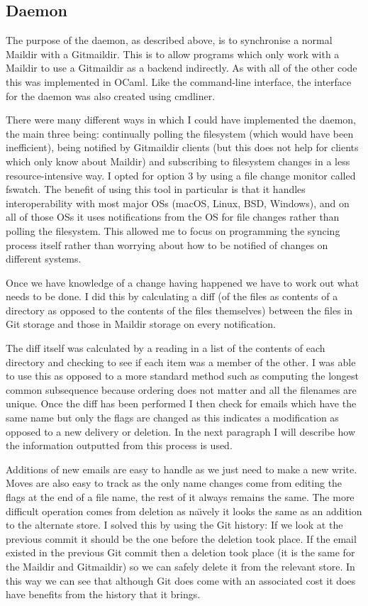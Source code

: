 \subsection{Daemon}

The purpose of the daemon, as described above, is to synchronise a normal Maildir with a Gitmaildir. This is to allow programs which only work with a Maildir to use a Gitmaildir as a backend indirectly. As with all of the other code this was implemented in OCaml. Like the command-line interface, the interface for the daemon was also created using cmdliner.

There were many different ways in which I could have implemented the daemon, the main three being: continually polling the filesystem (which would have been inefficient), being notified by Gitmaildir clients (but this does not help for clients which only know about Maildir) and subscribing to filesystem changes in a less resource-intensive way. I opted for option 3 by using a file change monitor called fswatch\cite{code_fswatch}. The benefit of using this tool in particular is that it handles interoperability with most major OSs (macOS, Linux, BSD, Windows), and on all of those OSs it uses notifications from the OS for file changes rather than polling the filesystem. This allowed me to focus on programming the syncing process itself rather than worrying about how to be notified of changes on different systems.

Once we have knowledge of a change having happened we have to work out what needs to be done. I did this by calculating a diff (of the files as contents of a directory as opposed to the contents of the files themselves) between the files in Git storage and those in Maildir storage on every notification.

The diff itself was calculated by a reading in a list of the contents of each directory and checking to see if each item was a member of the other. I was able to use this as opposed to a more standard method such as computing the longest common subsequence because ordering does not matter and all the filenames are unique. Once the diff has been performed I then check for emails which have the same name but only the flags are changed as this indicates a modification as opposed to a new delivery or deletion. In the next paragraph I will describe how the information outputted from this process is used.

Additions of new emails are easy to handle as we just need to make a new write. Moves are also easy to track as the only name changes come from editing the flags at the end of a file name, the rest of it always remains the same. The more difficult operation comes from deletion as na\"{\i}vely it looks the same as an addition to the alternate store. I solved this by using the Git history: If we look at the previous commit it should be the one before the deletion took place. If the email existed in the previous Git commit then a deletion took place (it is the same for the Maildir and Gitmaildir) so we can safely delete it from the relevant store. In this way we can see that although Git does come with an associated cost it does have benefits from the history that it brings.

